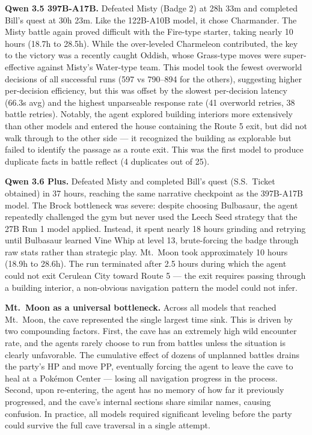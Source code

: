\documentclass{article}
\begin{document}
\textbf{Qwen 3.5 397B-A17B.} Defeated Misty (Badge 2) at 28h 33m and completed Bill's quest at 30h 23m. Like the 122B-A10B model, it chose Charmander. The Misty battle again proved difficult with the Fire-type starter, taking nearly 10 hours (18.7h to 28.5h). While the over-leveled Charmeleon contributed, the key to the victory was a recently caught Oddish, whose Grass-type moves were super-effective against Misty's Water-type team. This model took the fewest overworld decisions of all successful runs (597 vs 790--894 for the others), suggesting higher per-decision efficiency, but this was offset by the slowest per-decision latency (66.3s avg) and the highest unparseable response rate (41 overworld retries, 38 battle retries). Notably, the agent explored building interiors more extensively than other models and entered the house containing the Route 5 exit, but did not walk through to the other side --- it recognized the building as explorable but failed to identify the passage as a route exit. This was the first model to produce duplicate facts in battle reflect (4 duplicates out of 25).

\textbf{Qwen 3.6 Plus.} Defeated Misty and completed Bill's quest (S.S.\ Ticket obtained) in 37 hours, reaching the same narrative checkpoint as the 397B-A17B model. The Brock bottleneck was severe: despite choosing Bulbasaur, the agent repeatedly challenged the gym but never used the Leech Seed strategy that the 27B Run 1 model applied. Instead, it spent nearly 18 hours grinding and retrying until Bulbasaur learned Vine Whip at level 13, brute-forcing the badge through raw stats rather than strategic play. Mt.\ Moon took approximately 10 hours (18.9h to 28.6h). The run terminated after 2.5 hours during which the agent could not exit Cerulean City toward Route 5 --- the exit requires passing through a building interior, a non-obvious navigation pattern the model could not infer.

\textbf{Mt.\ Moon as a universal bottleneck.} Across all models that reached Mt.\ Moon, the cave represented the single largest time sink. This is driven by two compounding factors. First, the cave has an extremely high wild encounter rate, and the agents rarely choose to run from battles unless the situation is clearly unfavorable. The cumulative effect of dozens of unplanned battles drains the party's HP and move PP, eventually forcing the agent to leave the cave to heal at a Pok\'{e}mon Center --- losing all navigation progress in the process. Second, upon re-entering, the agent has no memory of how far it previously progressed, and the cave's internal sections share similar names, causing confusion. In practice, all models required significant leveling before the party could survive the full cave traversal in a single attempt.
\end{document}
